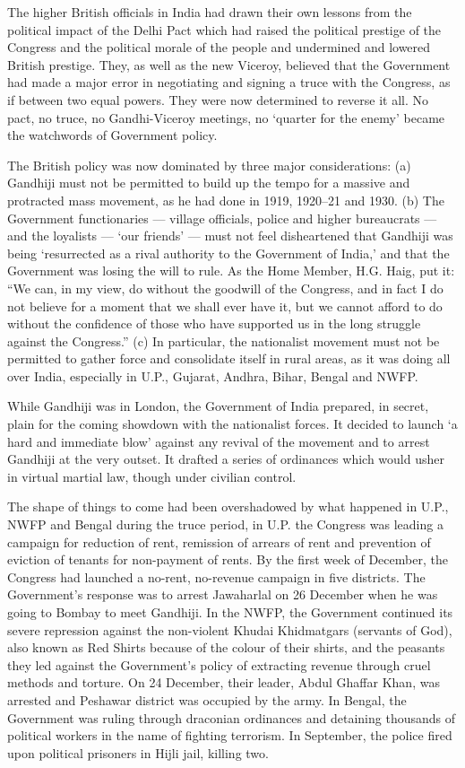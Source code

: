 \begin{multicols}{2}
The higher British officials in India had drawn their own lessons from the political impact of the Delhi Pact which had raised the political prestige of the Congress and the political morale of the people and undermined and lowered British prestige. They, as well as the new Viceroy, believed that the Government had made a major error in negotiating and signing a truce with the Congress, as if between two equal powers. They were now determined to reverse it all. No pact, no truce, no Gandhi-Viceroy meetings, no `quarter for the enemy' became the watchwords of Government policy.

The British policy was now dominated by three major considerations: (a) Gandhiji must not be permitted to build up the tempo for a massive and protracted mass movement, as he had done in 1919, 1920--21 and 1930. (b) The Government functionaries --- village officials, police and higher bureaucrats --- and the loyalists --- `our friends' --- must not feel disheartened that Gandhiji was being `resurrected as a rival authority to the Government of India,' and that the Government was losing the will to rule. As the Home Member, H.G. Haig, put it: ``We can, in my view, do without the goodwill of the Congress, and in fact I do not believe for a moment that we shall ever have it, but we cannot afford to do without the confidence of those who have supported us in the long struggle against the Congress.'' (c) In particular, the nationalist movement must not be permitted to gather force and consolidate itself in rural areas, as it was doing all over India, especially in U.P., Gujarat, Andhra, Bihar, Bengal and NWFP.

While Gandhiji was in London, the Government of India prepared, in secret, plain for the coming showdown with the nationalist forces. It decided to launch `a hard and immediate blow' against any revival of the movement and to arrest Gandhiji at the very outset. It drafted a series of ordinances which would usher in virtual martial law, though under civilian control.

The shape of things to come had been overshadowed by what happened in U.P., NWFP and Bengal during the truce period, in U.P. the Congress was leading a campaign for reduction of rent, remission of arrears of rent and prevention of eviction of tenants for non-payment of rents. By the first week of December, the Congress had launched a no-rent, no-revenue campaign in five districts. The Government's response was to arrest Jawaharlal on 26 December when he was going to Bombay to meet Gandhiji. In the NWFP, the Government continued its severe repression against the non-violent Khudai Khidmatgars (servants of God), also known as Red Shirts because of the colour of their shirts, and the peasants they led against the Government's policy of extracting revenue through cruel methods and torture. On 24 December, their leader, Abdul Ghaffar Khan, was arrested and Peshawar district was occupied by the army. In Bengal, the Government was ruling through draconian ordinances and detaining thousands of political workers in the name of fighting terrorism. In September, the police fired upon political prisoners in Hijli jail, killing two.


\end{multicols}
